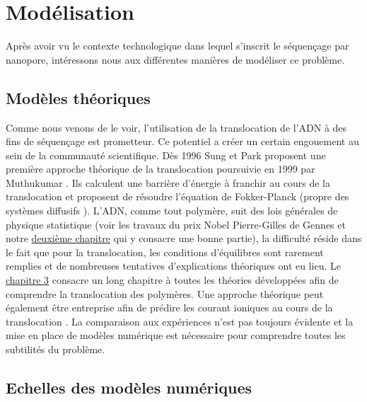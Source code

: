 \section{Modélisation}


Après avoir vu le contexte technologique dans lequel s'inscrit le séquençage par nanopore, intéressons nous aux différentes manières de modéliser ce problème.





\subsection{Modèles théoriques}

Comme nous venons de le voir, l'utilisation de la translocation de l'ADN à des fins de séquençage est prometteur. Ce potentiel a créer un certain engouement au sein de la communauté scientifique. Dès 1996  Sung et Park proposent une première approche théorique de la translocation \cite{Sung1996} poursuivie en 1999 par Muthukumar \cite{Muthukumar1999}. Ils calculent une barrière d'énergie à franchir au cours de la translocation et proposent de résoudre l'équation de Fokker-Planck (propre des systèmes diffusifs \cite{shiriaev1992selected}). L'ADN, comme tout polymère, suit des lois générales de physique statistique (voir les travaux du prix Nobel Pierre-Gilles de Gennes \cite{Gennes197911} et notre \hyperref[resideal]{deuxième chapitre} qui y consacre une bonne partie), la difficulté réside dans le fait que pour la translocation, les conditions d'équilibres sont rarement remplies et de nombreuses tentatives d'explications théoriques ont eu lieu. Le \hyperref[translocmurfixe]{chapitre 3} consacre un long chapitre à toutes les théories développées afin de comprendre la translocation des polymères. Une approche théorique peut également être entreprise afin de prédire les courant ioniques au cours de la translocation \cite{Im2002,Noskov2004,Saraniti2006}. La comparaison aux expériences n'est pas toujours évidente et la mise en place de modèles numérique est nécessaire pour comprendre toutes les subtilités du problème.




\subsection{Echelles des modèles numériques}


